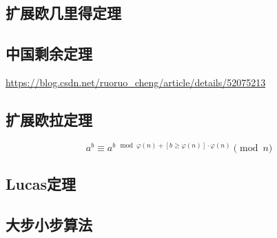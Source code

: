 \documentclass{article}
\begin{document}
		\subsection{扩展欧几里得定理}
		
		\subsection{中国剩余定理}
		\url{https://blog.csdn.net/ruoruo_cheng/article/details/52075213}
		
		\subsection{扩展欧拉定理}
		$$
		a^b \equiv a^{b \mod \varphi(n) + [b \ge \varphi(n)] \cdot \varphi(n)} \pmod{n}
		$$
		
		\subsection{Lucas定理}
		
		\subsection{大步小步算法}
		
\end{document}
